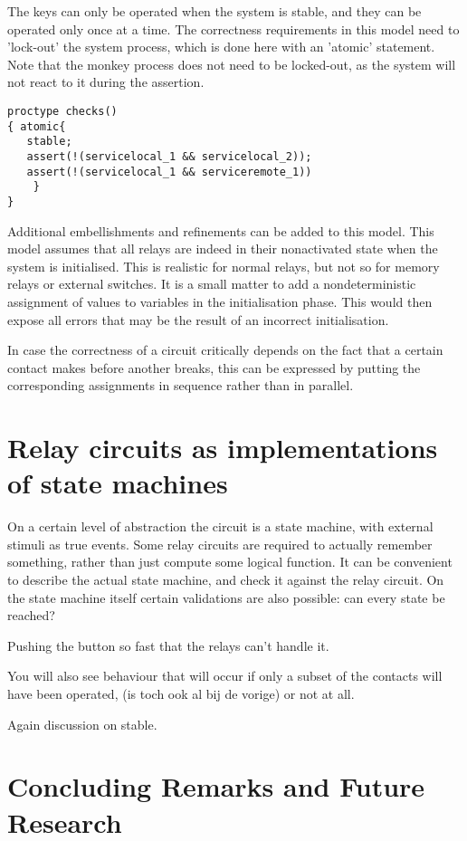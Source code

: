 The keys can only be operated when the system is stable,
 and they can be operated only once at a time.
The correctness requirements in this model need to 'lock-out' the system
process, which is done here with an 'atomic' statement.
Note that the monkey process does not need to be locked-out, as the system
will not react to it during the assertion.

\begin{verbatim}
proctype checks()
{ atomic{
   stable;
   assert(!(servicelocal_1 && servicelocal_2));
   assert(!(servicelocal_1 && serviceremote_1))
	}
}
\end{verbatim}

Additional embellishments and refinements can be added to this model.
This model assumes that all relays are indeed in their nonactivated state
when the system is initialised.
This is realistic for normal relays, but not so for memory relays or external switches.
It is a small matter to add a nondeterministic assignment of values to variables in the initialisation phase. This would then expose all errors
that may be the result of an incorrect initialisation.

In case the correctness of a circuit critically depends on the fact that
a certain contact makes before another breaks, this can be expressed by putting the corresponding assignments in sequence rather than in parallel.

\section{Relay circuits as implementations of state machines}


On a certain level of abstraction the circuit is a state machine, with external stimuli as
true events. Some relay circuits are required to actually remember something, rather than just
compute some logical function.
It can be convenient to describe the actual state machine, and check it against the relay circuit.
On the state machine itself certain validations are also possible: can every state be
reached?


Pushing the button so fast that the relays can't handle it.

You will also see behaviour that will occur if only a subset of the contacts will have been
operated, (is toch ook al bij de vorige)
or not at all.

Again discussion on stable.

\section{Concluding Remarks and Future Research}

